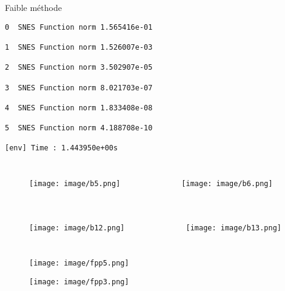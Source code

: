 \documentclass[11pt]{beamer}
\begin{document}
\begin{frame}

\begin{block}{Faible méthode}

\begin{verbatim}
0  SNES Function norm 1.565416e-01

1  SNES Function norm 1.526007e-03

2  SNES Function norm 3.502907e-05

3  SNES Function norm 8.021703e-07

4  SNES Function norm 1.833408e-08

5  SNES Function norm 4.188708e-10

[env] Time : 1.443950e+00s
\end{verbatim}
\end{block}

\begin{columns}
\begin{figure}
\texttt{[image: image/b5.png]}
\end{figure}
\begin{figure}
\texttt{[image: image/b6.png]}
\end{figure}
\end{columns}

\end{frame}



\begin{frame}

\begin{columns}
\begin{figure}
\texttt{[image: image/b12.png]}
\end{figure}
\begin{figure}
\texttt{[image: image/b13.png]}
\end{figure}
\end{columns}

\end{frame}


\begin{frame}

\begin{figure}
\texttt{[image: image/fpp5.png]}
\end{figure}

\begin{figure}
\texttt{[image: image/fpp3.png]}
\end{figure}


\end{frame}
\end{document}

